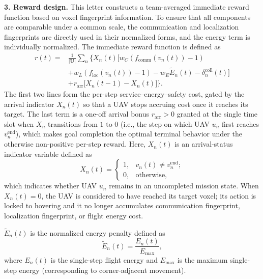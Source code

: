 \documentclass[lettersize,journal]{IEEEtran}
\begin{document}
\noindent\textbf{3. Reward design.}
This letter constructs a team-averaged immediate reward function based on voxel fingerprint information. To ensure that all components are comparable under a common scale, the communication and localization fingerprints are directly used in their normalized forms, and the energy term is individually normalized. The immediate reward function is defined as
\begin{equation}
\begin{aligned}
r(t)=&\frac{1}{|\mathbf{U}|}\sum_{n}\Big\{X_n(t)\Big[
 w_C(f_{\mathrm{comm}}(v_n(t))-1)\\
&+w_L(f_{\mathrm{loc}}(v_n(t))-1)-w_E\widetilde{E}_n(t)-\delta_n^{\mathrm{coll}}(t)\Big]\\
&+r_{\mathrm{arr}}\big[X_n(t-1)-X_n(t)\big]\Big\}.
\end{aligned}
\end{equation}
The first two lines form the per-step service--energy--safety cost, gated by the arrival indicator $X_n(t)$ so that a UAV stops accruing cost once it reaches its target. The last term is a one-off arrival bonus $r_{\mathrm{arr}}>0$ granted at the single time slot when $X_n$ transitions from $1$ to $0$ (i.e., the step on which UAV $u_n$ first reaches $v_n^{\mathrm{end}}$), which makes goal completion the optimal terminal behavior under the otherwise non-positive per-step reward.
Here, $X_n(t)$ is an arrival-status indicator variable defined as
\begin{equation}
X_n(t)=
\begin{cases}
1, & v_n(t)\neq v_n^{\mathrm{end}};\\
0, & \mathrm{otherwise},
\end{cases}
\end{equation}
which indicates whether UAV $u_n$ remains in an uncompleted mission state. When $X_n(t)=0$, the UAV is considered to have reached its target voxel; its action is locked to hovering and it no longer accumulates communication fingerprint, localization fingerprint, or flight energy cost.

$\widetilde{E}_n(t)$ is the normalized energy penalty defined as
\begin{equation}
\widetilde{E}_n(t)=\frac{E_n(t)}{E_{\max}},
\end{equation}
where $E_n(t)$ is the single-step flight energy and $E_{\max}$ is the maximum single-step energy (corresponding to corner-adjacent movement).
\end{document}
